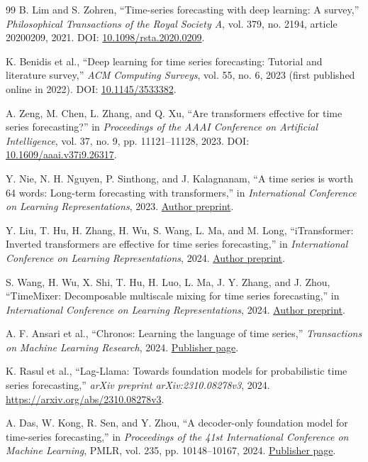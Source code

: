 \begin{thebibliography}{99}
B. Lim and S. Zohren, ``Time-series forecasting with deep learning: A survey,'' \emph{Philosophical Transactions of the Royal Society A}, vol. 379, no. 2194, article 20200209, 2021. DOI: \href{https://doi.org/10.1098/rsta.2020.0209}{10.1098/rsta.2020.0209}.

K. Benidis et al., ``Deep learning for time series forecasting: Tutorial and literature survey,'' \emph{ACM Computing Surveys}, vol. 55, no. 6, 2023 (first published online in 2022). DOI: \href{https://doi.org/10.1145/3533382}{10.1145/3533382}.

A. Zeng, M. Chen, L. Zhang, and Q. Xu, ``Are transformers effective for time series forecasting?'' in \emph{Proceedings of the AAAI Conference on Artificial Intelligence}, vol. 37, no. 9, pp. 11121--11128, 2023. DOI: \href{https://doi.org/10.1609/aaai.v37i9.26317}{10.1609/aaai.v37i9.26317}.

Y. Nie, N. H. Nguyen, P. Sinthong, and J. Kalagnanam, ``A time series is worth 64 words: Long-term forecasting with transformers,'' in \emph{International Conference on Learning Representations}, 2023. \href{https://arxiv.org/abs/2211.14730}{Author preprint}.

Y. Liu, T. Hu, H. Zhang, H. Wu, S. Wang, L. Ma, and M. Long, ``iTransformer: Inverted transformers are effective for time series forecasting,'' in \emph{International Conference on Learning Representations}, 2024. \href{https://arxiv.org/abs/2310.06625}{Author preprint}.

S. Wang, H. Wu, X. Shi, T. Hu, H. Luo, L. Ma, J. Y. Zhang, and J. Zhou, ``TimeMixer: Decomposable multiscale mixing for time series forecasting,'' in \emph{International Conference on Learning Representations}, 2024. \href{https://arxiv.org/abs/2405.14616}{Author preprint}.

A. F. Ansari et al., ``Chronos: Learning the language of time series,'' \emph{Transactions on Machine Learning Research}, 2024. \href{https://openreview.net/forum?id=gerNCVqqtR}{Publisher page}.

K. Rasul et al., ``Lag-Llama: Towards foundation models for probabilistic time series forecasting,'' \emph{arXiv preprint arXiv:2310.08278v3}, 2024. \url{https://arxiv.org/abs/2310.08278v3}.

A. Das, W. Kong, R. Sen, and Y. Zhou, ``A decoder-only foundation model for time-series forecasting,'' in \emph{Proceedings of the 41st International Conference on Machine Learning}, PMLR, vol. 235, pp. 10148--10167, 2024. \href{https://proceedings.mlr.press/v235/das24c.html}{Publisher page}.


\end{thebibliography}
